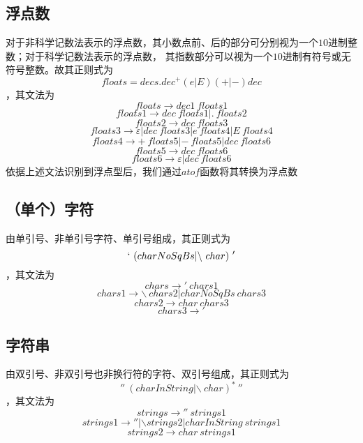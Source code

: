 \documentclass[UTF8]{ctexart}
\begin{document}
\subsection{浮点数}
对于非科学记数法表示的浮点数，其小数点前、后的部分可分别视为一个$10$进制整数；对于科学记数法表示的浮点数，
其指数部分可以视为一个$10$进制有符号或无符号整数。故其正则式为
$$ floats = decs.{dec}^+(e|E)(+|-)dec $$
，其文法为
$$ floats \rightarrow dec1 \ floats1 $$
$$ floats1 \rightarrow dec \ floats1 | . \ floats2 $$
$$ floats2 \rightarrow dec \ floats3 $$
$$ floats3 \rightarrow \varepsilon | dec \ floats3 | e \ floats4 | E \ floats4 $$
$$ floats4 \rightarrow + \ floats5 | - \ floats5 | dec \ floats6 $$
$$ floats5 \rightarrow dec \ floats6 $$
$$ floats6 \rightarrow \varepsilon | dec \ floats6 $$
依据上述文法识别到浮点型后，我们通过$atof$函数将其转换为浮点数
\subsection{（单个）字符}
由单引号、非单引号字符、单引号组成，其正则式为
$$ ` \ (charNoSqBs | \backslash \ char) \ ' $$
，其文法为
$$ chars \rightarrow ' \ chars1 $$
$$ chars1 \rightarrow \backslash \ chars2 | charNoSqBs \ chars3 $$
$$ chars2 \rightarrow char \ chars3 $$
$$ chars3 \rightarrow ' $$
\subsection{字符串}
由双引号、非双引号也非换行符的字符、双引号组成，其正则式为
$$ '' \ {(charInString | \backslash \ char)}^* \ '' $$
，其文法为
$$ strings \rightarrow '' \ strings1 $$
$$ strings1 \rightarrow '' | \backslash strings2 | charInString \ strings1 $$
$$ strings2 \rightarrow char \ strings1 $$
\end{document}
